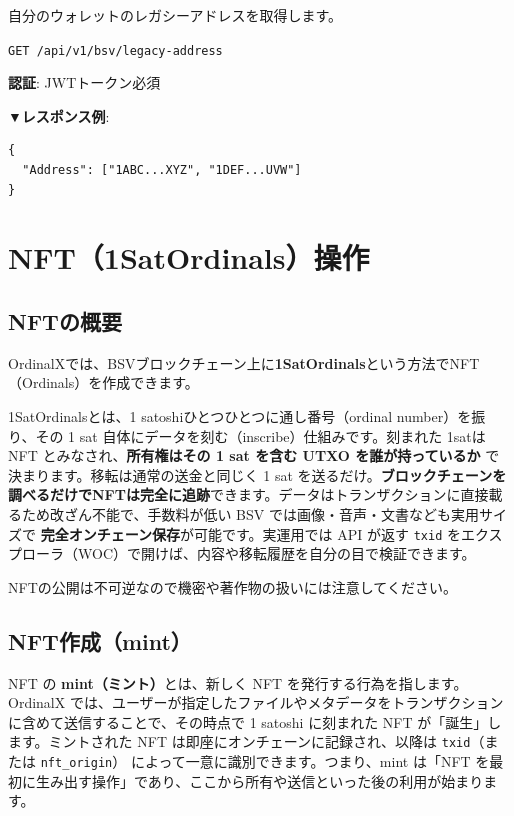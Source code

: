 \documentclass[11pt,a4paper]{ltjsarticle}  %
\begin{document}
自分のウォレットのレガシーアドレスを取得します。

\begin{tcolorbox}[colback=blue!5,colframe=blue!50!black,title=エンドポイント]
\texttt{GET /api/v1/bsv/legacy-address}
\end{tcolorbox}

\textbf{認証}: JWTトークン必須

\textbf{▼レスポンス例}:
\begin{lstlisting}[style=json]
{
  "Address": ["1ABC...XYZ", "1DEF...UVW"]
}
\end{lstlisting}

\section{NFT（1SatOrdinals）操作}

\subsection{NFTの概要}
OrdinalXでは、BSVブロックチェーン上に\textbf{1SatOrdinals}という方法でNFT（Ordinals）を作成できます。

1SatOrdinalsとは、1 satoshiひとつひとつに通し番号（ordinal number）を振り、その 1 sat 自体にデータを刻む（inscribe）仕組みです。刻まれた 1satはNFT とみなされ、\textbf{所有権はその 1 sat を含む UTXO を誰が持っているか} で決まります。移転は通常の送金と同じく 1 sat を送るだけ。\textbf{ブロックチェーンを調べるだけでNFTは完全に追跡}できます。データはトランザクションに直接載るため改ざん不能で、手数料が低い BSV では画像・音声・文書なども実用サイズで \textbf{完全オンチェーン保存}が可能です。実運用では API が返す \texttt{txid} をエクスプローラ（WOC）で開けば、内容や移転履歴を自分の目で検証できます。


\begin{tcolorbox}[colback=red!10,colframe=red!50!black,title=NFTの公開は不可逆]
NFTの公開は不可逆なので機密や著作物の扱いには注意してください。
\end{tcolorbox}


\subsection{NFT作成（mint）}

NFT の \textbf{mint（ミント）}とは、新しく NFT を発行する行為を指します。OrdinalX では、ユーザーが指定したファイルやメタデータをトランザクションに含めて送信することで、その時点で 1 satoshi に刻まれた NFT が「誕生」します。ミントされた NFT は即座にオンチェーンに記録され、以降は \texttt{txid}（または \verb|nft_origin|） によって一意に識別できます。つまり、mint は「NFT を最初に生み出す操作」であり、ここから所有や送信といった後の利用が始まります。
\end{document}
